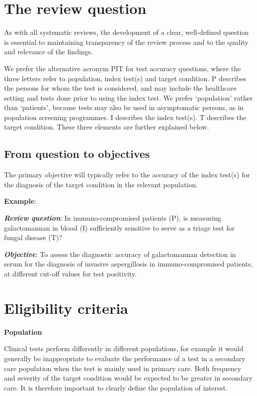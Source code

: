 \documentclass[
  11pt,
  a4paper,
  DIV=11,
  numbers=noendperiod]{scrreprt}
\begin{document}
\section{The review question}\label{the-review-question}

As with all systematic reviews, the development of a clear, well-defined
question is essential to maintaining transparency of the review process
and to the quality and relevance of the findings.

We prefer the alternative acronym PIT for test accuracy questions, where
the three letters refer to population, index test(s) and target
condition. P describes the persons for whom the test is considered, and
may include the healthcare setting and tests done prior to using the
index test. We prefer `population' rather than `patients', because tests
may also be used in asymptomatic persons, as in population screening
programmes. I describes the index test(s). T describes the target
condition. These three elements are further explained below.

\subsection{From question to
objectives}\label{from-question-to-objectives}

The primary objective will typically refer to the accuracy of the index
test(s) for the diagnosis of the target condition in the relevant
population.

\textbf{Example}:

\textbf{\emph{Review question}}: In immuno-compromised patients (P), is
measuring galactomannan in blood (I) sufficiently sensitive to serve as
a triage test for fungal disease (T)?

\textbf{\emph{Objective}}: To assess the diagnostic accuracy of
galactomannan detection in serum for the diagnosis of invasive
aspergillosis in immuno-compromised patients, at different cut‐off
values for test positivity.

\section{Eligibility criteria}\label{eligibility-criteria-1}

\textbf{Population}

Clinical tests perform differently in different populations, for example
it would generally be inappropriate to evaluate the performance of a
test in a secondary care population when the test is mainly used in
primary care. Both frequency and severity of the target condition would
be expected to be greater in secondary care. It is therefore important
to clearly define the population of interest.
\end{document}
